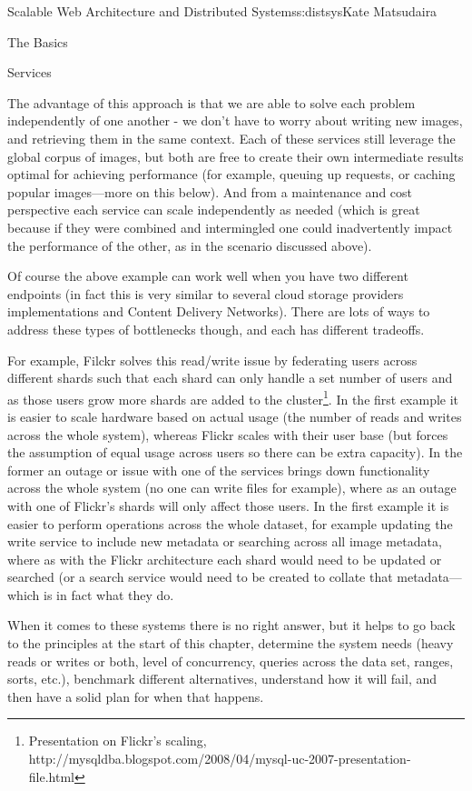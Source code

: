 \begin{aosachapter}{Scalable Web Architecture and Distributed Systems}{s:distsys}{Kate Matsudaira}
\begin{aosasect1}{The Basics}
\begin{aosasect2}{Services}

The advantage of this approach is that we are able to solve each
problem independently of one another - we don’t have to worry about
writing new images, and retrieving them in the same context. Each of
these services still leverage the global corpus of images, but both
are free to create their own intermediate results optimal for
achieving performance (for example, queuing up requests, or caching
popular images---more on this below). And from a maintenance and cost
perspective each service can scale independently as needed (which is
great because if they were combined and intermingled one could
inadvertently impact the performance of the other, as in the scenario
discussed above).

Of course the above example can work well when you have two different
endpoints (in fact this is very similar to several cloud storage
providers implementations and Content Delivery Networks). There are
lots of ways to address these types of bottlenecks though, and each
has different tradeoffs.

For example, Filckr solves this read/write issue by federating users
across different shards such that each shard can only handle a set
number of users and as those users grow more shards are added to the
cluster\footnote{Presentation on Flickr’s scaling,
  http://mysqldba.blogspot.com/2008/04/mysql-uc-2007-presentation-file.html}. In
the first example it is easier to scale hardware based on actual usage
(the number of reads and writes across the whole system), whereas
Flickr scales with their user base (but forces the assumption of equal
usage across users so there can be extra capacity). In the former an
outage or issue with one of the services brings down functionality
across the whole system (no one can write files for example), where as
an outage with one of Flickr’s shards will only affect those users. In
the first example it is easier to perform operations across the whole
dataset, for example updating the write service to include new
metadata or searching across all image metadata, where as with the
Flickr architecture each shard would need to be updated or searched
(or a search service would need to be created to collate that
metadata---which is in fact what they do.

When it comes to these systems there is no right answer, but it helps
to go back to the principles at the start of this chapter, determine
the system needs (heavy reads or writes or both, level of concurrency,
queries across the data set, ranges, sorts, etc.), benchmark different
alternatives, understand how it will fail, and then have a solid plan
for when that happens.


\end{aosasect2}
\end{aosasect1}
\end{aosachapter}

